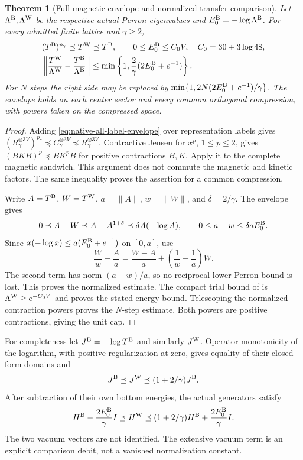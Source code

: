 \documentclass[11pt,oneside,openany]{book}
\newtheorem{theorem}{Theorem}[chapter]
\theoremstyle{definition}
\theoremstyle{remark}
\newcommand{\src}[2]{\cite[#2]{#1}}
\begin{document}
\begin{theorem}[Full magnetic envelope and normalized transfer comparison]
\label{thm:native-Perron-comparison}
Let $\Lambda^{\rm B},\Lambda^{\rm W}$ be the respective actual
Perron eigenvalues and $E_0^{\rm B}=-\log\Lambda^{\rm B}$.
For every admitted finite lattice and $\gamma\ge2$,
\begin{align}
 &(T^{\rm B})^{p_\gamma}\preceq T^{\rm W}\preceq T^{\rm B},
       \qquad 0\le E_0^{\rm B}\le C_0V,
       \quad C_0=30+3\log48,\notag\\
 &\left\|\frac{T^{\rm W}}{\Lambda^{\rm W}}
                  -\frac{T^{\rm B}}{\Lambda^{\rm B}}\right\|
 \le\min\left\{1,\frac2\gamma(2E_0^{\rm B}+e^{-1})\right\}.
 \label{eq:native-Perron-comparison}
\end{align}
For $N$ steps the right side may be replaced by
$\min\{1,2N(2E_0^{\rm B}+e^{-1})/\gamma\}$.
The envelope holds on each center sector and every common orthogonal
compression, with powers taken on the compressed space.
\end{theorem}
\begin{proof}
Adding \cref{eq:native-all-label-envelope} over representation labels
gives $(R_\gamma^{\otimes3V})^{p_\gamma}
\preceq C_\gamma^{\otimes3V}\preceq R_\gamma^{\otimes3V}$.
Contractive Jensen for $x^p$, $1\le p\le2$, gives
$(BKB)^p\preceq BK^pB$ for positive contractions $B,K$.
Apply it to the complete magnetic sandwich. This argument does not
commute the magnetic and kinetic factors. The same inequality proves
the assertion for a common compression.

Write $A=T^{\rm B}$, $W=T^{\rm W}$, $a=\|A\|$, $w=\|W\|$,
and $\delta=2/\gamma$. The envelope gives
\[
 0\preceq A-W\preceq A-A^{1+\delta}
                  \preceq\delta A(-\log A),\qquad
 0\le a-w\le\delta aE_0^{\rm B}.
\]
Since $x(-\log x)\le a(E_0^{\rm B}+e^{-1})$ on $[0,a]$, use
\[
 \frac Ww-\frac Aa=\frac{W-A}{a}
                    +\left(\frac1w-\frac1a\right)W.
\]
The second term has norm $(a-w)/a$, so no reciprocal lower Perron
bound is lost. This proves the normalized estimate. The compact trial
bound of \src{F16B}{V51} is
$\Lambda^{\rm W}\ge e^{-C_0V}$ and proves the stated energy bound.
Telescoping the normalized contraction powers proves the $N$-step
estimate. Both powers are positive contractions, giving the unit cap.
\end{proof}

For completeness let $J^{\rm B}=-\log T^{\rm B}$ and similarly
$J^{\rm W}$. Operator monotonicity of the logarithm, with positive
regularization at zero, gives equality of their closed form domains and
\begin{equation}
 J^{\rm B}\preceq J^{\rm W}\preceq(1+2/\gamma)J^{\rm B}.
 \label{eq:native-log-form-envelope}
\end{equation}
After subtraction of their own bottom energies, the actual generators
satisfy
\begin{equation}
 H^{\rm B}-\frac{2E_0^{\rm B}}\gamma I
 \preceq H^{\rm W}
 \preceq(1+2/\gamma)H^{\rm B}+\frac{2E_0^{\rm B}}\gamma I.
 \label{eq:native-subtracted-envelope}
\end{equation}
The two vacuum vectors are not identified. The extensive vacuum term
is an explicit comparison debit, not a vanished normalization constant.
\end{document}
